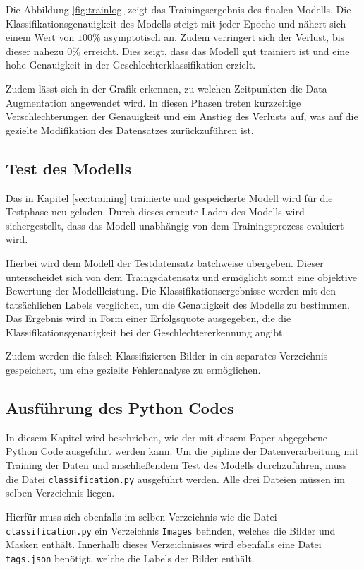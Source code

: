 \documentclass[journal,twoside,web]{ieeecolor}
\begin{document}
Die Abbildung \ref{fig:trainlog} zeigt das Trainingsergebnis des finalen Modells. Die Klassifikationsgenauigkeit des Modells steigt mit jeder Epoche und nähert sich einem Wert von $100 \%$ asymptotisch an. Zudem verringert sich der Verlust, bis dieser nahezu $0 \%$ erreicht. Dies zeigt, dass das Modell gut trainiert ist und eine hohe Genauigkeit in der Geschlechterklassifikation erzielt.

Zudem lässt sich in der Grafik erkennen, zu welchen Zeitpunkten die Data Augmentation angewendet wird. In diesen Phasen treten kurzzeitige Verschlechterungen der Genauigkeit und ein Anstieg des Verlusts auf, was auf die gezielte Modifikation des Datensatzes zurückzuführen ist.

\subsection{Test des Modells}
Das in Kapitel \ref{sec:training} trainierte und gespeicherte Modell wird für die Testphase neu geladen. Durch dieses erneute Laden des Modells wird sichergestellt, dass das Modell unabhängig von dem Trainingsprozess evaluiert wird.

Hierbei wird dem Modell der Testdatensatz batchweise übergeben. Dieser unterscheidet sich von dem Traingsdatensatz und ermöglicht somit eine objektive Bewertung der Modellleistung. Die Klassifikationsergebnisse werden mit den tatsächlichen Labels verglichen, um die Genauigkeit des Modells zu bestimmen. Das Ergebnis wird in Form einer Erfolgsquote ausgegeben, die die Klassifikationsgenauigkeit bei der Geschlechtererkennung angibt.

Zudem werden die falsch Klassifizierten Bilder in ein separates Verzeichnis gespeichert, um eine gezielte Fehleranalyse zu ermöglichen.


\subsection{Ausführung des Python Codes}

In diesem Kapitel wird beschrieben, wie der mit diesem Paper abgegebene Python Code ausgeführt werden kann.
Um die pipline der Datenverarbeitung mit Training der Daten und anschließendem Test des Modells durchzuführen, muss die Datei \texttt{classification.py} ausgeführt werden. Alle drei Dateien müssen im selben Verzeichnis liegen.

Hierfür muss sich ebenfalls im selben Verzeichnis wie die Datei \texttt{classification.py} ein Verzeichnis \texttt{Images} befinden, welches die Bilder und Masken enthält. Innerhalb dieses Verzeichnisses wird ebenfalls eine Datei \texttt{tags.json} benötigt, welche die Labels der Bilder enthält.
\end{document}
